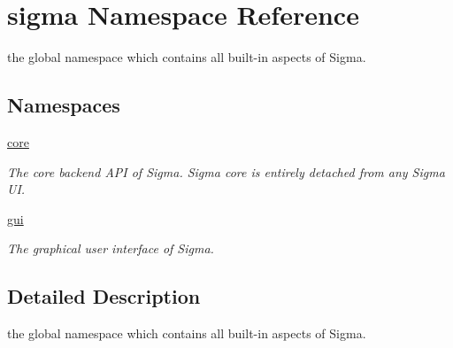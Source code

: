 \hypertarget{namespacesigma}{}\section{sigma Namespace Reference}
\label{namespacesigma}


the global namespace which contains all built-\/in aspects of Sigma.  


\subsection*{Namespaces}
\begin{DoxyCompactItemize}
\item 
 \hyperlink{namespacesigma_1_1core}{core}
\begin{DoxyCompactList}\small\item\em The core backend A\+P\+I of Sigma. Sigma core is entirely detached from any Sigma U\+I. \end{DoxyCompactList}\item 
 \hyperlink{namespacesigma_1_1gui}{gui}
\begin{DoxyCompactList}\small\item\em The graphical user interface of Sigma. \end{DoxyCompactList}\end{DoxyCompactItemize}


\subsection{Detailed Description}
the global namespace which contains all built-\/in aspects of Sigma. 